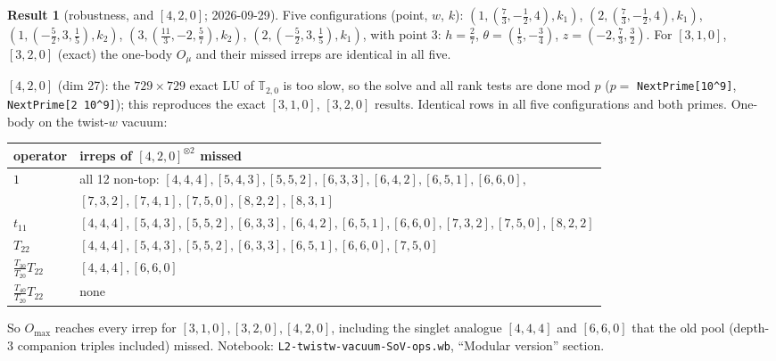 \documentclass[11pt]{article}
\newcommand{\nb}[1]{\texttt{#1}}
\theoremstyle{definition}
\newtheorem{result}{Result}
\theoremstyle{remark}
\begin{document}
\begin{result}[{robustness, and $[4,2,0]$; 2026-09-29}]
Five configurations (point, $w$, $k$): $(1,(\tfrac73,-\tfrac12,4),k_1)$, $(2,(\tfrac73,-\tfrac12,4),k_1)$, $(1,(-\tfrac52,3,\tfrac15),k_2)$, $(3,(\tfrac{11}3,-2,\tfrac57),k_2)$, $(2,(-\tfrac52,3,\tfrac15),k_1)$, with point 3: $h=\tfrac27$, $\theta=(\tfrac15,-\tfrac34)$, $z=(-2,\tfrac73,\tfrac32)$. For $[3,1,0]$, $[3,2,0]$ (exact) the one-body $O_\mu$ and their missed irreps are identical in all five.

$[4,2,0]$ (dim 27): the $729\times729$ exact LU of $\mathbb T_{2,0}$ is too slow, so the solve and all rank tests are done mod $p$ ($p=$ \texttt{NextPrime[10\^{}9]}, \texttt{NextPrime[2 10\^{}9]}); this reproduces the exact $[3,1,0]$, $[3,2,0]$ results. Identical rows in all five configurations and both primes. One-body on the twist-$w$ vacuum:
\begin{center}
\begin{tabular}{ll}\toprule
operator & irreps of $[4,2,0]^{\otimes2}$ missed\\\midrule
$1$ & all 12 non-top: $[4,4,4],[5,4,3],[5,5,2],[6,3,3],[6,4,2],[6,5,1],[6,6,0],$\\
 & \quad $[7,3,2],[7,4,1],[7,5,0],[8,2,2],[8,3,1]$\\
$t_{11}$ & $[4,4,4],[5,4,3],[5,5,2],[6,3,3],[6,4,2],[6,5,1],[6,6,0],[7,3,2],[7,5,0],[8,2,2]$\\
$T_{22}$ & $[4,4,4],[5,4,3],[5,5,2],[6,3,3],[6,5,1],[6,6,0],[7,5,0]$\\
$\tfrac{T_{30}}{T_{20}}T_{22}$ & $[4,4,4],[6,6,0]$\\
$\tfrac{T_{40}}{T_{20}}T_{22}$ & none\\\bottomrule
\end{tabular}
\end{center}
So $O_{\max}$ reaches every irrep for $[3,1,0],[3,2,0],[4,2,0]$, including the singlet analogue $[4,4,4]$ and $[6,6,0]$ that the old pool (depth-3 companion triples included) missed. Notebook: \nb{L2-twistw-vacuum-SoV-ops.wb}, ``Modular version'' section.
\end{result}
\end{document}
